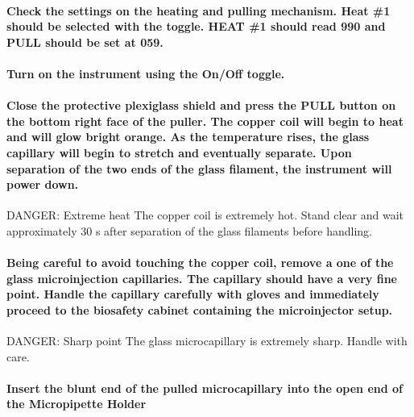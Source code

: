 \documentclass[11pt]{article}
\newcommand\dangersign[1][4ex]{\renewcommand\stacktype{L}\scaleto{\stackon[1pt]{\color{red}$\triangle$}{\tiny !}}{#1}}
\begin{document}
\paragraph{{\bfseries\sffamily } Check the settings on the heating and pulling mechanism. Heat \#1 should be selected with the toggle. HEAT \#1 should read 990 and PULL should be set at 059.}
\label{sec:orgheadline26}
\paragraph{{\bfseries\sffamily } Turn on the instrument using the On/Off toggle.}
\label{sec:orgheadline27}
\paragraph{{\bfseries\sffamily } Close the protective plexiglass shield and press the PULL button on the bottom right face of the puller. The copper coil will begin to heat and will glow bright orange. As the temperature rises, the glass capillary will begin to stretch and eventually separate. Upon separation of the two ends of the glass filament, the instrument will power down.\\}
\label{sec:orgheadline28}
\begin{bclogo}[logo=\dangersign, couleurBarre=red, noborder=true, couleur=yellow!20]{     DANGER: Extreme heat}
The copper coil is extremely hot. Stand clear and wait approximately 30 s after separation of the glass filaments before handling.\\
\end{bclogo}
\paragraph{{\bfseries\sffamily } Being careful to avoid touching the copper coil, remove a one of the glass microinjection capillaries. The capillary should have a very fine point. Handle the capillary carefully with gloves and immediately proceed to the biosafety cabinet containing the microinjector setup. \\}
\label{sec:orgheadline29}
\begin{bclogo}[logo=\dangersign, couleurBarre=red, noborder=true, couleur=yellow!20]{     DANGER: Sharp point}
The glass microcapillary is extremely sharp. Handle with care.\\
\end{bclogo}
\paragraph{{\bfseries\sffamily } Insert the blunt end of the pulled microcapillary into the open end of the Micropipette Holder}
\label{sec:orgheadline30}
\end{document}
